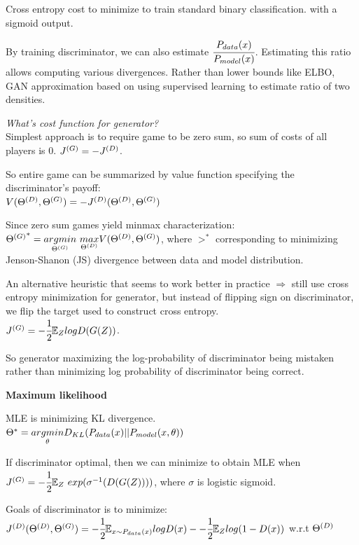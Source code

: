\documentclass[12pt,a4paper]{article}
\begin{document}
Cross entropy cost to minimize to train standard binary classification. with a sigmoid output. 

By training discriminator, we can also estimate $\cfrac{P_{data}(x)}{P_{model}(x)}$. Estimating this ratio allows computing various divergences. 
Rather than lower bounds like ELBO, GAN approximation based on using supervised learning to estimate ratio of two densities. 

\vspace{0.5cm}
\textit{What's cost function for generator?}\\
Simplest approach is to require game to be zero sum, so sum of costs of all players is 0. $J^{(G)}=-J^{(D)}$. 

So entire game can be summarized by value function specifying the discriminator's payoff: \\
$V({\Theta^{(D)}},{\Theta^{(G)}})=-J^{(D)}({\Theta^{(D)}},{\Theta^{(G)}})$

Since zero sum games yield minmax characterization: \\
${\gt}^* =\argminp{\gt}\ \underset{\dt}{max}V(\dt,\gt)$, where ${\gt}^*$ corresponding to minimizing Jenson-Shanon (JS) divergence between data and model distribution.

An alternative heuristic that seems to work better in practice $\Rightarrow$ still use cross entropy minimization for generator, but instead of flipping sign on discriminator, we flip the target used to construct cross entropy. \\
$J^{(G)}=-\cfrac{1}{2} \mathbb{E}_Z logD(G(Z))$. 

So generator maximizing the log-probability of discriminator being mistaken rather than minimizing log probability of discriminator  being correct.

\vspace{0.5cm}
\textbf{Maximum likelihood}

MLE is minimizing KL divergence. \\
$\Theta^*=\underset{\theta}{argmin}D_{KL}(P_{data}(x)||P_{model}(x,\theta))$

If discriminator optimal, then we can minimize to obtain MLE when\\ 
$\jg=\mhalf\ee_Z\ exp(\sigma^{-1}(D(G(Z))))$, where $\sigma$ is logistic sigmoid. 


\vspace{0.5cm}
Goals of discriminator is to minimize: \\
$J^{(D)}({\Theta^{(D)}},{\Theta^{(G)}})=-\cfrac{1}{2} \mathbb{E}_{x\sim P_{data}(x)}logD(x)--\cfrac{1}{2} \mathbb{E}_Z log(1-D(x))$ w.r.t ${\Theta^{(D)}}$
\end{document}
